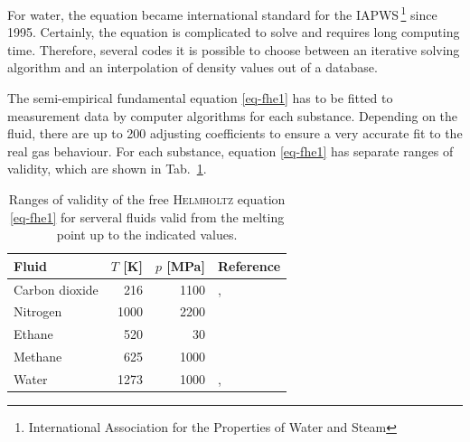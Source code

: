 For water, the equation became international standard for the IAPWS\,\footnote{International Association for the Properties of Water and Steam} since 1995. Certainly, the equation is complicated to solve and requires long computing time. Therefore, several codes it is possible to choose between an iterative solving algorithm 
and an interpolation of density values out of a database. 

The semi-empirical fundamental equation \eqref{eq-fhe1} has to be fitted to measurement data by computer algorithms for each substance. Depending on the fluid, there are up to 200 adjusting coefficients to ensure a very accurate fit to the real gas behaviour. For each 
substance, equation \eqref{eq-fhe1} has separate ranges of validity, which are shown in Tab.~\ref{tab-eos-val}.

\begin{table}[H]
  \caption{\label{tab-eos-val}Ranges of validity of the free \textsc{Helmholtz} equation \eqref{eq-fhe1} for serveral fluids valid from the melting point up to the indicated 
  values.}
 \begin{center}
 \begin{tabular}{lrrl}
  \toprule
  	Fluid		&$T$ [K]    &$p$ [MPa]	& Reference\\
  \midrule
  Carbon dioxide 	& 216 		& 1100 		& \cite{SpaWag:96}, \cite{Spa:93}\\
  Nitrogen      	 & 1000 		& 2200 		& \cite{SpaLem:00}\\
  Ethane        	 & 520 		& 30 			& \cite{BueWag:06}\\ 
  Methane       	 & 625 		& 1000 		& \cite{SetWag:91}\\
  Water         	 & 1273 		& 1000 		& \cite{PruWag:95}, \cite{WagPru:02}\\
 \bottomrule
 \end{tabular}
 \end{center}
\end{table}

%

